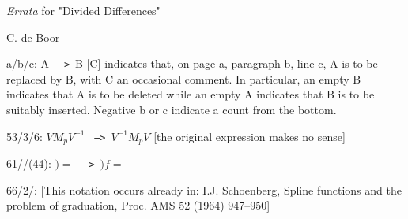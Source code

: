 \nopagenumbers
\centerline{{\it Errata} for "Divided Differences"}
\medskip
\centerline{C. de Boor}
\bigskip\parskip6pt
\def\ct{\ {\tt -->}\ }
\def\inv#1{{#1}^{-1}}

a/b/c: A \ct B [C] indicates that, on page a, paragraph b, line c, A is to be
replaced by B, with C an occasional comment.
In particular, an empty B indicates that A is to be deleted while an empty A
indicates that B is to be suitably inserted.
 Negative b or c indicate a count from the bottom.

53/3/6:  $VM_p\inv{V}$ \ct  $\inv{V}M_pV$  [the original expression makes no sense]

61//(44): $) =$ \ct  $)f =$

66/2/: [This notation occurs already in: I.J. Schoenberg, Spline functions and the problem of graduation, Proc. AMS 52 (1964) 947--950]

\bye
